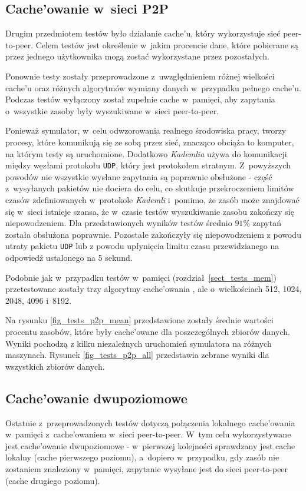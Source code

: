 \documentclass[a4paper,11pt]{scrartcl}
\newcommand{\f}{\texttt}
\newcommand{\s}{ }
\newcommand{\kesz}{cache}
\newcommand{\keszu}{cache'u}
\newcommand{\keszowania}{cache'owania}
\newcommand{\keszowane}{cache'owane}
\newcommand{\keszowanie}{cache'owanie}
\newcommand{\Keszowanie}{Cache'owanie}
\newcommand{\keszowaniem}{cache'owaniem}
\begin{document}
\subsection{\Keszowanie\s w~sieci P2P}
Drugim przedmiotem testów było działanie \keszu, który wykorzystuje sieć peer-to-peer. Celem testów jest określenie w~jakim procencie dane, które pobierane są przez jednego użytkownika mogą zostać wykorzystane przez pozostałych.

Ponownie testy zostały przeprowadzone z~uwzględnieniem różnej wielkości \keszu\s oraz różnych algorytmów wymiany danych w~przypadku pełnego \keszu. Podczas testów wyłączony został zupełnie \kesz\s w~pamięci, aby zapytania o~wszystkie zasoby były wyszukiwane w~sieci peer-to-peer.

Ponieważ symulator, w~celu odwzorowania realnego środowiska pracy, tworzy procesy, które komunikują się ze sobą przez sieć, znacząco obciąża to komputer, na którym testy są uruchomione. Dodatkowo \textit{Kademlia} używa do komunikacji między węzłami protokołu \f{UDP}, który jest protokołem stratnym. Z~powyższych powodów nie wszystkie wysłane zapytania są poprawnie obsłużone - część z~wysyłanych pakietów nie dociera do celu, co skutkuje przekroczeniem limitów czasów zdefiniowanych w~protokole \textit{Kademli} i~pomimo, że zasób może znajdować się w~sieci istnieje szansa, że w~czasie testów wyszukiwanie zasobu zakończy się niepowodzeniem.
Dla przedstawionych wyników testów średnio $91\%$ zapytań została obsłużona poprawnie. Pozostałe zakończyły się niepowodzeniem z powodu utraty pakietu \f{UDP} lub z powodu upłynięcia limitu czasu przewidzianego na odpowiedź ustalonego na 5 sekund.

Podobnie jak w~przypadku testów w~pamięci (rozdział~\ref{sect_tests_mem}) przetestowane zostały trzy algorytmy \keszowania\s, ale o~wielkościach 512, 1024, 2048, 4096 i~8192.

Na rysunku \ref{fig_tests_p2p_mean} przedstawione zostały średnie wartości procentu zasobów, które były \keszowane\s dla poszczególnych zbiorów danych. Wyniki pochodzą z kilku niezależnych uruchomień symulatora na różnych maszynach. Rysunek \ref{fig_tests_p2p_all} przedstawia zebrane wyniki dla wszystkich zbiorów danych.

\subsection{\Keszowanie\s dwupoziomowe}
Ostatnie z~przeprowadzonych testów dotyczą połączenia lokalnego \keszowania\s w~pamięci z~\keszowaniem\s w~sieci peer-to-peer. W~tym celu wykorzystywane jest \keszowanie\s dwupoziomowe - w~pierwszej kolejności sprawdzany jest \kesz\s lokalny (\kesz\s pierwszego poziomu), a~dopiero w~przypadku, gdy zasób nie zostaniem znaleziony w~pamięci, zapytanie wysyłane jest do sieci peer-to-peer (\kesz\s drugiego poziomu).
\end{document}
